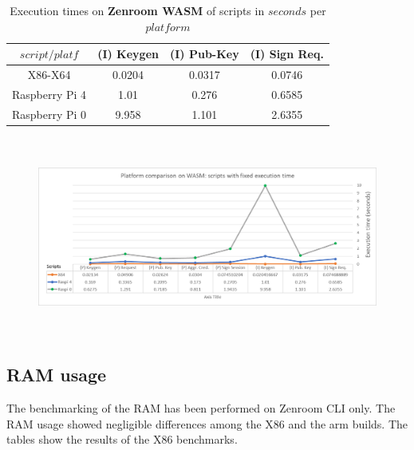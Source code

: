 \documentclass[twocolumn]{article}
\begin{document}
\begin{table}[h!]
  \begin{center}
    \caption{Execution times on \textbf{Zenroom WASM} of scripts in $seconds$ per $platform$}
      \label{tab:table1}
        \begin{tabular} {c|c|c|c}
          \toprule
\textbf{$script / platf$} &  \textbf{(I) Keygen}& \textbf{(I) Pub-Key}& \textbf{(I) Sign Req.} \\
          \midrule
X86-X64				&		0.0204	&	0.0317	&	0.0746	\\
Raspberry Pi  4	&		1.01	&	0.276	&	0.6585	\\
Raspberry Pi  0	&		9.958	&	1.101	&	2.6355	\\
      \bottomrule %
    \end{tabular}
  \end{center}
\end{table}


\begin{figure}[h!]
    \centering
    \includegraphics[width=6in, height=2.6in]{graphs/WASMfixed.png}
    \label{fig:galaxy}
\end{figure}



\newpage

\subsection*{RAM usage}

The benchmarking of the RAM has been performed on Zenroom CLI only. The RAM usage showed negligible differences among the X86 and the arm builds. The tables show the results of the X86 benchmarks.   
\end{document}
